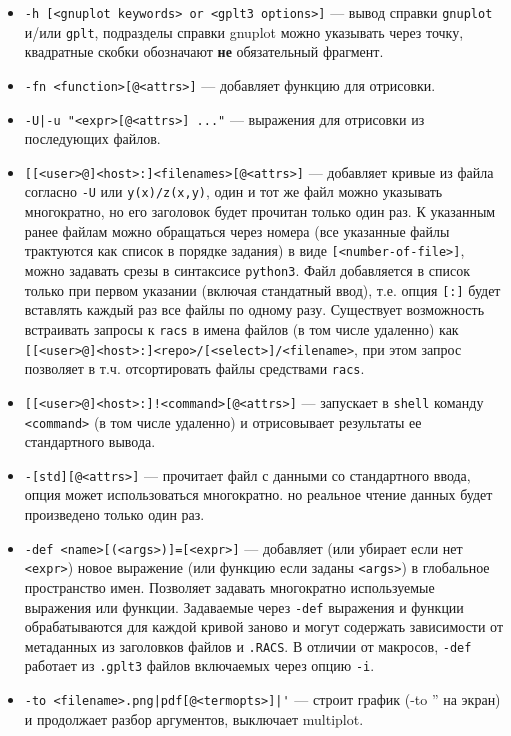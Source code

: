 \documentclass[12pt]{article}
\def\gplt{{\tt gplt}}
\def\gnuplot{{\tt gnuplot}}
\def\python{{\tt python3}}
\begin{document}
\begin{itemize}
\item \verb'-h [<gnuplot keywords> or <gplt3 options>]' --- вывод справки \gnuplot{} и/или \gplt, 
  подразделы справки gnuplot можно указывать через точку, квадратные скобки обозначают {\bf не} обязательный фрагмент.
\item \verb'-fn <function>[@<attrs>]' --- добавляет функцию для отрисовки.
\item \verb'-U|-u "<expr>[@<attrs>] ..."' --- выражения для отрисовки из последующих файлов.
\item \verb'[[<user>@]<host>:]<filenames>[@<attrs>]' --- добавляет кривые из файла согласно \verb'-U' или \verb'y(x)/z(x,y)', один и тот же файл можно
  указывать многократно, но его заголовок будет прочитан только один раз. К указанным ранее файлам можно обращаться
  через номера (все указанные файлы трактуются как список в порядке задания) в виде \verb'[<number-of-file>]', можно задавать
  срезы в синтаксисе \python. Файл добавляется в список только при первом указании (включая стандатный ввод), т.е. опция \verb'[:]' будет
  вставлять каждый раз все файлы по одному разу. Существует возможность встраивать запросы к \verb'racs'  в имена файлов (в том числе удаленно) как 
   \verb'[[<user>@]<host>:]<repo>/[<select>]/<filename>', при этом запрос позволяет в т.ч. отсортировать файлы средствами \verb'racs'.
\item \verb'[[<user>@]<host>:]!<command>[@<attrs>]' --- запускает в \verb'shell' команду \verb'<command>' (в том числе удаленно) и отрисовывает 
   результаты ее стандартного вывода.
\item \verb'-[std][@<attrs>]' --- прочитает файл с данными со стандартного ввода, опция может использоваться многократно. но реальное чтение данных
  будет произведено только один раз.
\item \verb'-def <name>[(<args>)]=[<expr>]' --- добавляет (или убирает если нет \verb'<expr>')
новое выражение (или функцию если заданы \verb'<args>') в глобальное пространство имен. Позволяет задавать 
многократно используемые выражения или функции. Задаваемые через \verb'-def' выражения и функции
обрабатываются для каждой кривой заново и могут содержать зависимости от метаданных из 
заголовков файлов и \verb'.RACS'. 
В отличии от макросов, \verb'-def' работает из \verb'.gplt3' файлов включаемых через опцию \verb'-i'.
\item \verb:-to <filename>.png|pdf[@<termopts>]|': --- строит график (-to '' на экран)
    и продолжает разбор аргументов, выключает multiplot. 

\end{itemize}
\end{document}
